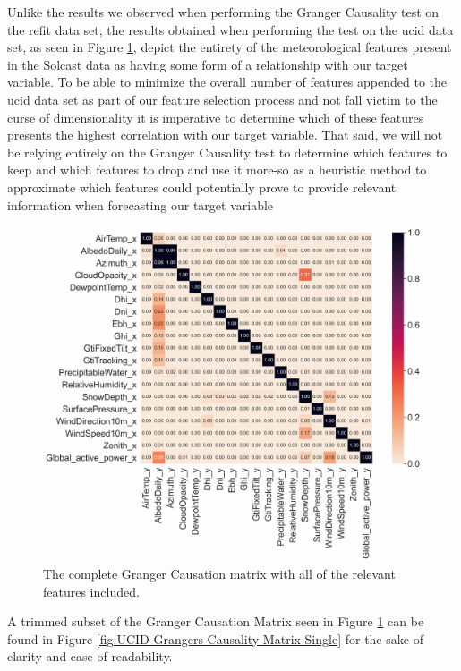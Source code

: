 \noindent Unlike the results we observed when performing the Granger Causality test on the \gls{refit} data set, the results obtained when performing the test on the \gls{ucid} data set, as seen in Figure \ref{fig:UCID-Grangers-Causality-Matrix-All}, depict the entirety of the meteorological features present in the Solcast data as having some form of a relationship with our target variable. To be able to minimize the overall number of features appended to the \gls{ucid} data set as part of our feature selection process and not fall victim to the curse of dimensionality it is imperative to determine which of these features presents the highest correlation with our target variable. That said, we will not be relying entirely on the Granger Causality test to determine which features to keep and which features to drop and use it more-so as a heuristic method to approximate which features could potentially prove to provide relevant information when forecasting our target variable

\begin{figure}[H]
    \centering
    \includegraphics[width=\textwidth]{Images/Chapter 5/UCID/UCID-Grangers-Causality-Matrix.pdf}
    \caption{The complete Granger Causation matrix with all of the relevant features included.}
    \label{fig:UCID-Grangers-Causality-Matrix-All}
\end{figure}

\noindent A trimmed subset of the Granger Causation Matrix seen in Figure \ref{fig:UCID-Grangers-Causality-Matrix-All} can be found in Figure \ref{fig:UCID-Grangers-Causality-Matrix-Single} for the sake of clarity and ease of readability.

